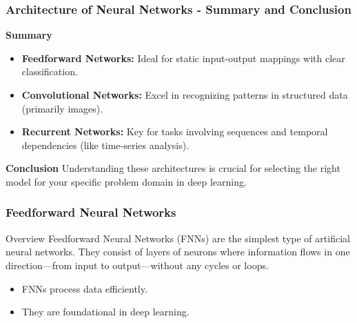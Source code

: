 \documentclass[aspectratio=169]{beamer}
\begin{document}
\begin{frame}[fragile]
  \frametitle{Architecture of Neural Networks - Summary and Conclusion}
  
  \textbf{Summary}
  
  \begin{itemize}
    \item \textbf{Feedforward Networks:} Ideal for static input-output mappings with clear classification.
    \item \textbf{Convolutional Networks:} Excel in recognizing patterns in structured data (primarily images).
    \item \textbf{Recurrent Networks:} Key for tasks involving sequences and temporal dependencies (like time-series analysis).
  \end{itemize}
  
  \textbf{Conclusion}
  Understanding these architectures is crucial for selecting the right model for your specific problem domain in deep learning.
  
\end{frame}

\begin{frame}[fragile]
    \frametitle{Feedforward Neural Networks}
    \begin{block}{Overview}
        Feedforward Neural Networks (FNNs) are the simplest type of artificial neural networks. They consist of layers of neurons where information flows in one direction—from input to output—without any cycles or loops.
    \end{block}
    \begin{itemize}
        \item FNNs process data efficiently.
        \item They are foundational in deep learning.
    \end{itemize}
\end{frame}
\end{document}
